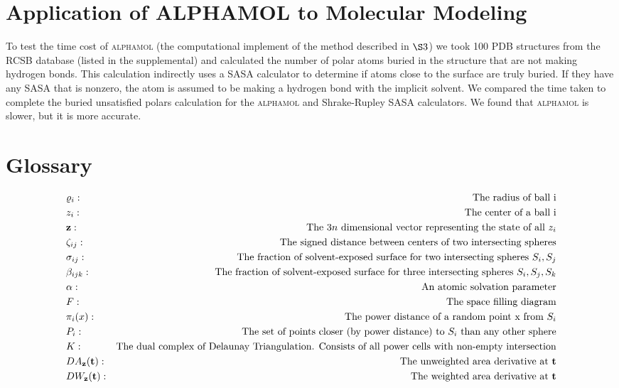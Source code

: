 \documentclass{article}
\begin{document}
\section{Application of ALPHAMOL to Molecular Modeling}
To test the time cost of \textsc{alphamol} (the computational implement of the method described in $\S3$) we took 100 PDB structures from the RCSB database (listed in the supplemental) and calculated the number of polar atoms buried in the structure that are not making hydrogen bonds. This calculation indirectly uses a SASA calculator to determine if atoms close to the surface are truly buried. If they have any SASA that is nonzero, the atom is assumed to be making a hydrogen bond with the implicit solvent. We compared the time taken to complete the buried unsatisfied polars calculation for the \textsc{alphamol} and Shrake-Rupley SASA calculators. We found that \textsc{alphamol} is slower, but it is more accurate.


\section{Glossary}
\begin{align*}
&\varrho_i:&\text{The radius of ball i} \\
&z_i:&\text{The center of a ball i} \\
&{\bf z}:&\text{The $3n$ dimensional vector representing the state of all $z_i$} \\
&\zeta_{ij}:&\text{The signed distance between centers of two intersecting spheres} \\
&\sigma_{ij}:&\text{The fraction of solvent-exposed surface for two intersecting spheres $S_i,S_j$} \\
&\beta_{ijk}:&\text{The fraction of solvent-exposed surface for three intersecting spheres $S_i,S_j, S_k$} \\
&\alpha:&\text{An atomic solvation parameter} \\
&F:&\text{The space filling diagram} \\
&\pi_i(x):&\text{The power distance of a random point x from $S_i$} \\
&P_i:&\text{The set of points closer (by power distance) to $S_i$ than any other sphere} \\
&K:&\text{The dual complex of Delaunay Triangulation. Consists of all power cells with non-empty intersection} \\
&DA_{\bf z}({\bf t}):&\text{The unweighted area derivative at \textbf{t}} \\
&DW_{\bf z}({\bf t}):&\text{The weighted area derivative at \textbf{t}} \\
\end{align*}
\end{document}
